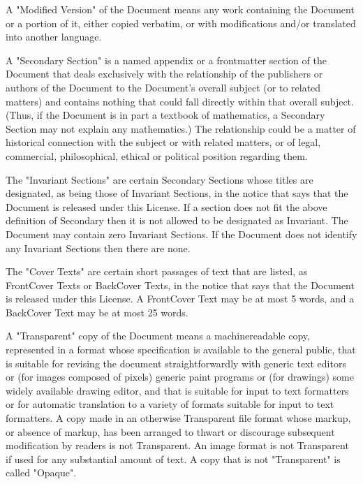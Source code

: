 \documentclass[a4paper,11pt]{report}
\begin{document}
{ A "Modified Version" of the Document means any work containing the Document or
a portion of it, either copied verbatim, or with modifications and/or
translated into another language. 

 A "Secondary Section" is a named appendix or a front\texttt{}matter
section of the Document that deals exclusively with the relationship of the
publishers or authors of the Document to the Document's overall subject (or to
related matters) and contains nothing that could fall directly within that
overall subject. (Thus, if the Document is in part a textbook of mathematics,
a Secondary Section may not explain any mathematics.) The relationship could
be a matter of historical connection with the subject or with related matters,
or of legal, commercial, philosophical, ethical or political position
regarding them. 

 The "Invariant Sections" are certain Secondary Sections whose titles are
designated, as being those of Invariant Sections, in the notice that says that
the Document is released under this License. If a section does not fit the
above definition of Secondary then it is not allowed to be designated as
Invariant. The Document may contain zero Invariant Sections. If the Document
does not identify any Invariant Sections then there are none. 

 The "Cover Texts" are certain short passages of text that are listed, as
Front\texttt{}Cover Texts or Back\texttt{}Cover Texts,
in the notice that says that the Document is released under this License. A
Front\texttt{}Cover Text may be at most 5 words, and a
Back\texttt{}Cover Text may be at most 25 words. 

 A "Transparent" copy of the Document means a
machine\texttt{}readable copy, represented in a format whose
specification is available to the general public, that is suitable for
revising the document straightforwardly with generic text editors or (for
images composed of pixels) generic paint programs or (for drawings) some
widely available drawing editor, and that is suitable for input to text
formatters or for automatic translation to a variety of formats suitable for
input to text formatters. A copy made in an otherwise Transparent file format
whose markup, or absence of markup, has been arranged to thwart or discourage
subsequent modification by readers is not Transparent. An image format is not
Transparent if used for any substantial amount of text. A copy that is not
"Transparent" is called "Opaque". 

}
\end{document}
